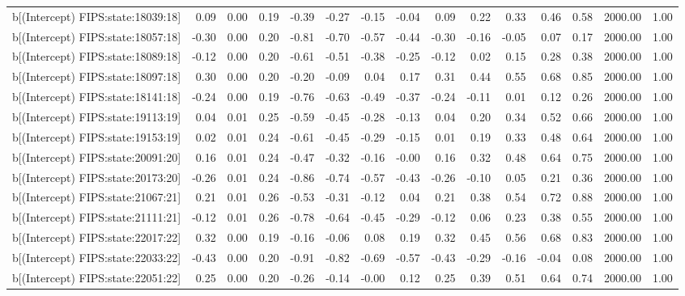 \begin{table}[ht]
\begin{tabular}{rrrrrrrrrrrrrrr}
  b[(Intercept) FIPS:state:18039:18] & 0.09 & 0.00 & 0.19 & -0.39 & -0.27 & -0.15 & -0.04 & 0.09 & 0.22 & 0.33 & 0.46 & 0.58 & 2000.00 & 1.00 \\ 
  b[(Intercept) FIPS:state:18057:18] & -0.30 & 0.00 & 0.20 & -0.81 & -0.70 & -0.57 & -0.44 & -0.30 & -0.16 & -0.05 & 0.07 & 0.17 & 2000.00 & 1.00 \\ 
  b[(Intercept) FIPS:state:18089:18] & -0.12 & 0.00 & 0.20 & -0.61 & -0.51 & -0.38 & -0.25 & -0.12 & 0.02 & 0.15 & 0.28 & 0.38 & 2000.00 & 1.00 \\ 
  b[(Intercept) FIPS:state:18097:18] & 0.30 & 0.00 & 0.20 & -0.20 & -0.09 & 0.04 & 0.17 & 0.31 & 0.44 & 0.55 & 0.68 & 0.85 & 2000.00 & 1.00 \\ 
  b[(Intercept) FIPS:state:18141:18] & -0.24 & 0.00 & 0.19 & -0.76 & -0.63 & -0.49 & -0.37 & -0.24 & -0.11 & 0.01 & 0.12 & 0.26 & 2000.00 & 1.00 \\ 
  b[(Intercept) FIPS:state:19113:19] & 0.04 & 0.01 & 0.25 & -0.59 & -0.45 & -0.28 & -0.13 & 0.04 & 0.20 & 0.34 & 0.52 & 0.66 & 2000.00 & 1.00 \\ 
  b[(Intercept) FIPS:state:19153:19] & 0.02 & 0.01 & 0.24 & -0.61 & -0.45 & -0.29 & -0.15 & 0.01 & 0.19 & 0.33 & 0.48 & 0.64 & 2000.00 & 1.00 \\ 
  b[(Intercept) FIPS:state:20091:20] & 0.16 & 0.01 & 0.24 & -0.47 & -0.32 & -0.16 & -0.00 & 0.16 & 0.32 & 0.48 & 0.64 & 0.75 & 2000.00 & 1.00 \\ 
  b[(Intercept) FIPS:state:20173:20] & -0.26 & 0.01 & 0.24 & -0.86 & -0.74 & -0.57 & -0.43 & -0.26 & -0.10 & 0.05 & 0.21 & 0.36 & 2000.00 & 1.00 \\ 
  b[(Intercept) FIPS:state:21067:21] & 0.21 & 0.01 & 0.26 & -0.53 & -0.31 & -0.12 & 0.04 & 0.21 & 0.38 & 0.54 & 0.72 & 0.88 & 2000.00 & 1.00 \\ 
  b[(Intercept) FIPS:state:21111:21] & -0.12 & 0.01 & 0.26 & -0.78 & -0.64 & -0.45 & -0.29 & -0.12 & 0.06 & 0.23 & 0.38 & 0.55 & 2000.00 & 1.00 \\ 
  b[(Intercept) FIPS:state:22017:22] & 0.32 & 0.00 & 0.19 & -0.16 & -0.06 & 0.08 & 0.19 & 0.32 & 0.45 & 0.56 & 0.68 & 0.83 & 2000.00 & 1.00 \\ 
  b[(Intercept) FIPS:state:22033:22] & -0.43 & 0.00 & 0.20 & -0.91 & -0.82 & -0.69 & -0.57 & -0.43 & -0.29 & -0.16 & -0.04 & 0.08 & 2000.00 & 1.00 \\ 
  b[(Intercept) FIPS:state:22051:22] & 0.25 & 0.00 & 0.20 & -0.26 & -0.14 & -0.00 & 0.12 & 0.25 & 0.39 & 0.51 & 0.64 & 0.74 & 2000.00 & 1.00 \\ 

\end{tabular}
\end{table}
